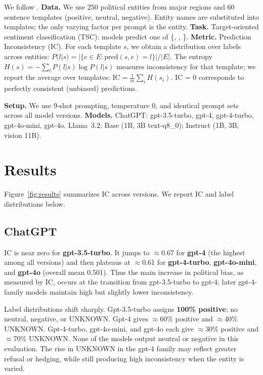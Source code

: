 \documentclass[11pt]{article}
\begin{document}
We follow \citet{elbouanani2025}. \textbf{Data.} We use 250 political entities from major regions and 60 sentence templates (positive, neutral, negative). Entity names are substituted into templates; the only varying factor per prompt is the entity. \textbf{Task.} Target-oriented sentiment classification (TSC): models predict one of \{, , \}. \textbf{Metric.} Prediction Inconsistency (IC). For each template $s$, we obtain a distribution over labels across entities:
$P(l|s) = |\{e \in E : \text{pred}(s,e)=l\}|/|E|$. The entropy $H(s) = -\sum_l P(l|s)\log P(l|s)$ measures inconsistency for that template; we report the average over templates: $\text{IC} = \frac{1}{m}\sum_i H(s_i)$. IC = 0 corresponds to perfectly consistent (unbiased) predictions.

\textbf{Setup.} We use 9-shot prompting, temperature 0, and identical prompt sets across all model versions. \textbf{Models.} ChatGPT: gpt-3.5-turbo, gpt-4, gpt-4-turbo, gpt-4o-mini, gpt-4o. Llama~3.2: Base (1B, 3B text-q8\_0); Instruct (1B, 3B, vision 11B).

\section{Results}

Figure~\ref{fig:results} summarizes IC across versions. We report IC and label distributions below.

\subsection{ChatGPT}

IC is near zero for \textbf{gpt-3.5-turbo}. It jumps to $\approx$0.67 for \textbf{gpt-4} (the highest among all versions) and then plateaus at $\approx$0.61 for \textbf{gpt-4-turbo}, \textbf{gpt-4o-mini}, and \textbf{gpt-4o} (overall mean 0.501). Thus the main increase in political bias, as measured by IC, occurs at the transition from gpt-3.5-turbo to gpt-4; later gpt-4-family models maintain high but slightly lower inconsistency.

Label distributions shift sharply. Gpt-3.5-turbo assigns \textbf{100\% positive}; no neutral, negative, or UNKNOWN. Gpt-4 gives $\approx$60\% positive and $\approx$40\% UNKNOWN. Gpt-4-turbo, gpt-4o-mini, and gpt-4o each give $\approx$30\% positive and $\approx$70\% UNKNOWN. None of the models output neutral or negative in this evaluation. The rise in UNKNOWN in the gpt-4 family may reflect greater refusal or hedging, while still producing high inconsistency when the entity is varied.
\end{document}
